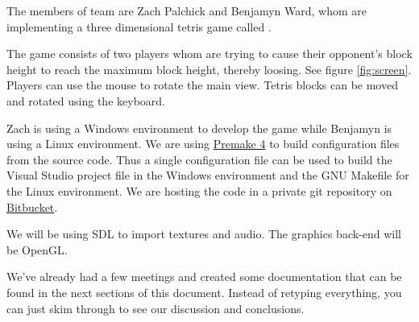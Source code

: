 
The members of team are Zach Palchick and Benjamyn Ward, whom are implementing
a three dimensional tetris game called . 

The game consists of two players whom are trying to cause their opponent's
block height to reach the maximum block height, thereby loosing. See figure
\ref{fig:screen}. Players can use the mouse to rotate the main view. Tetris
blocks can be moved and rotated using the keyboard.

Zach is using a Windows environment to develop the game while Benjamyn is using
a Linux environment. We are using
\href{http://industriousone.com/premake}{Premake 4} to build configuration
files from the source code. Thus a single configuration file can be used to
build the Visual Studio project file in the Windows environment and the GNU
Makefile for the Linux environment. We are hosting the code in a private git
repository on \href{http://bitbucket.org}{Bitbucket}.

We will be using SDL to import textures and audio. The graphics back-end will
be OpenGL.

We've already had a few meetings and created some documentation that can be
found in the next sections of this document. Instead of retyping everything,
you can just skim through to see our discussion and conclusions.
